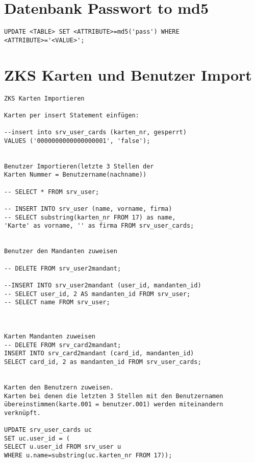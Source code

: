 \documentclass[a4paper,10pt]{report}
\begin{document}
\section{Datenbank Passwort to md5}
\begin{verbatim}
UPDATE <TABLE> SET <ATTRIBUTE>=md5('pass') WHERE <ATTRIBUTE>='<VALUE>';
\end{verbatim}

\section{ZKS Karten und Benutzer Import}
\begin{verbatim}
ZKS Karten Importieren

Karten per insert Statement einfügen:

--insert into srv_user_cards (karten_nr, gesperrt) 
VALUES ('0000000000000000001', 'false');


Benutzer Importieren(letzte 3 Stellen der 
Karten Nummer = Benutzername(nachname))

-- SELECT * FROM srv_user;

-- INSERT INTO srv_user (name, vorname, firma)
-- SELECT substring(karten_nr FROM 17) as name, 
'Karte' as vorname, '' as firma FROM srv_user_cards;


Benutzer den Mandanten zuweisen

-- DELETE FROM srv_user2mandant;

--INSERT INTO srv_user2mandant (user_id, mandanten_id)
-- SELECT user_id, 2 AS mandanten_id FROM srv_user;
-- SELECT name FROM srv_user;



Karten Mandanten zuweisen
-- DELETE FROM srv_card2mandant;
INSERT INTO srv_card2mandant (card_id, mandanten_id)
SELECT card_id, 2 as mandanten_id FROM srv_user_cards;


Karten den Benutzern zuweisen. 
Karten bei denen die letzten 3 Stellen mit den Benutzernamen 
übereinstimmen(karte.001 = benutzer.001) werden miteinandern verknüpft.

UPDATE srv_user_cards uc
SET uc.user_id = (
SELECT u.user_id FROM srv_user u 
WHERE u.name=substring(uc.karten_nr FROM 17));

\end{verbatim}
\end{document}
